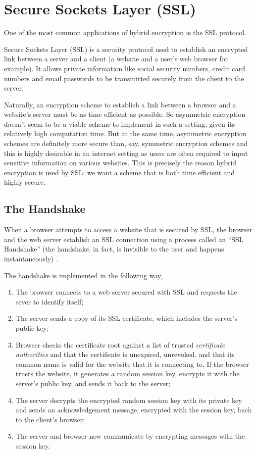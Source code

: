 \section{Secure Sockets Layer (SSL)}

One of the most common applications of hybrid encryption is the SSL protocol.

Secure Sockets Layer (SSL) is a security protocol used to establish an encrypted link between a server and a client (a website and a user's web browser for example). 
It allows private information like social security numbers, credit card numbers and email passwords to be transmitted securely from the client to the server.

Naturally, an encryption scheme to establish a link between a browser and a website's server must be as time efficient as possible. 
So asymmetric encryption doesn't seem to be a viable scheme to implement in such a setting, given its relatively high computation time. 
But at the same time, asymmetric encryption schemes are definitely more secure than, say, symmetric encryption schemes and this is highly desirable in an internet setting as users are often required to input sensitive information on various websites. 
This is precisely the reason hybrid encryption is used by SSL: we want a scheme that is both time efficient and highly secure.

\subsection{The Handshake}

When a browser attempts to access a website that is secured by SSL, the browser and the web server establish an SSL connection using a process called an “SSL Handshake” (the handshake, in fact, is invisible to the user and happens instantaneously) \cite{digicert}.

The handshake is implemented in the following way,
\begin{enumerate}
\item The browser connects to a web server secured with SSL and requests the sever to identify itself;
\item The server sends a copy of its SSL certificate, which includes the server's public key;
\item Browser checks the certificate root against a list of trusted \textit{certificate authorities} and that the certificate is unexpired, unrevoked, and that its common name is valid for the website that it is connecting to. If the browser trusts the website, it generates a random session key, encrypts it with the server's public key, and sends it back to the server;
\item The server decrypts the encrypted random session key with its private key and sends an acknowledgement message, encrypted with the session key, back to the client's browser;
\item The server and browser now communicate by encrypting messages with the session key.
\end{enumerate}  %

\label{sec:ssl}
